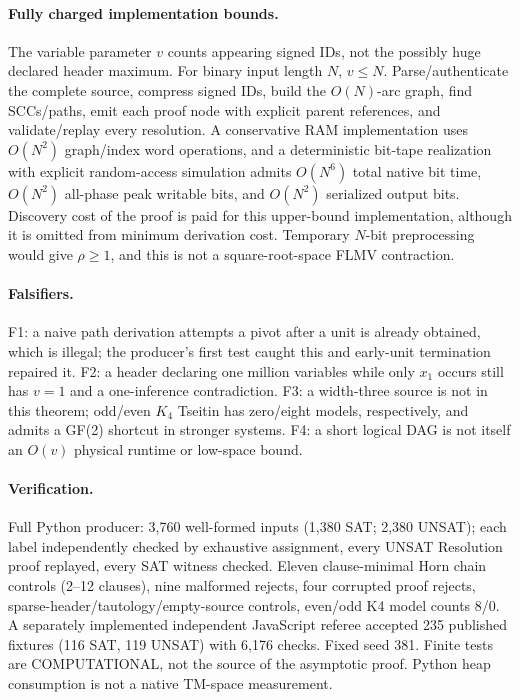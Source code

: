 \documentclass{article}
\begin{document}
\paragraph{Fully charged implementation bounds.} The variable parameter $v$ counts appearing signed IDs, not the possibly huge declared header maximum. For binary input length $N$, $v\le N$. Parse/authenticate the complete source, compress signed IDs, build the $O(N)$-arc graph, find SCCs/paths, emit each proof node with explicit parent references, and validate/replay every resolution. A conservative RAM implementation uses $O(N^2)$ graph/index word operations, and a deterministic bit-tape realization with explicit random-access simulation admits $O(N^6)$ total native bit time, $O(N^2)$ all-phase peak writable bits, and $O(N^2)$ serialized output bits. Discovery cost of the proof is paid for this upper-bound implementation, although it is omitted from minimum derivation cost. Temporary $N$-bit preprocessing would give $\rho\ge1$, and this is not a square-root-space FLMV contraction.

\paragraph{Falsifiers.} F1: a naive path derivation attempts a pivot after a unit is already obtained, which is illegal; the producer's first test caught this and early-unit termination repaired it. F2: a header declaring one million variables while only $x_1$ occurs still has $v=1$ and a one-inference contradiction. F3: a width-three source is not in this theorem; odd/even $K_4$ Tseitin has zero/eight models, respectively, and admits a GF(2) shortcut in stronger systems. F4: a short logical DAG is not itself an $O(v)$ physical runtime or low-space bound.

\paragraph{Verification.} Full Python producer: 3,760 well-formed inputs (1,380 SAT; 2,380 UNSAT); each label independently checked by exhaustive assignment, every UNSAT Resolution proof replayed, every SAT witness checked. Eleven clause-minimal Horn chain controls (2--12 clauses), nine malformed rejects, four corrupted proof rejects, sparse-header/tautology/empty-source controls, even/odd K4 model counts 8/0. A separately implemented independent JavaScript referee accepted 235 published fixtures (116 SAT, 119 UNSAT) with 6,176 checks. Fixed seed 381. Finite tests are COMPUTATIONAL, not the source of the asymptotic proof. Python heap consumption is not a native TM-space measurement.
\end{document}
